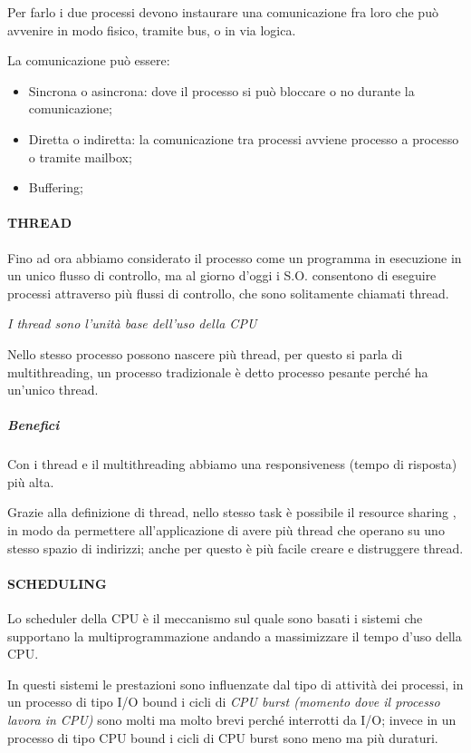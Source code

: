Per farlo i due processi devono instaurare una comunicazione fra loro
che può avvenire in modo fisico, tramite bus, o in via logica.

La comunicazione può essere:

\begin{itemize}
\item
  Sincrona o asincrona: dove il processo si può bloccare o no durante la
  comunicazione;
\item
  Diretta o indiretta: la comunicazione tra processi avviene processo a
  processo o tramite mailbox;
\item
  Buffering;
\end{itemize}

\paragraph{THREAD}\label{thread}

Fino ad ora abbiamo considerato il processo come un programma in
esecuzione in un unico flusso di controllo, ma al giorno d'oggi i S.O.
consentono di eseguire processi attraverso più flussi di controllo, che
sono solitamente chiamati thread.

\emph{I thread sono l'unità base dell'uso della CPU}

Nello stesso processo possono nascere più thread, per questo si parla di
multithreading, un processo tradizionale è detto processo pesante perché
ha un'unico thread.

\subparagraph{\texorpdfstring{\emph{Benefici}}{Benefici}}\label{benefici}

Con i thread e il multithreading abbiamo una responsiveness (tempo di
risposta) più alta.

Grazie alla definizione di thread, nello stesso task è possibile il
resource sharing , in modo da permettere all'applicazione di avere più
thread che operano su uno stesso spazio di indirizzi; anche per questo è
più facile creare e distruggere thread.

\paragraph{SCHEDULING}\label{scheduling}

Lo scheduler della CPU è il meccanismo sul quale sono basati i sistemi
che supportano la multiprogrammazione andando a massimizzare il tempo
d'uso della CPU.

In questi sistemi le prestazioni sono influenzate dal tipo di attività
dei processi, in un processo di tipo I/O bound i cicli di \emph{CPU
burst (momento dove il processo lavora in CPU)} sono molti ma molto
brevi perché interrotti da I/O; invece in un processo di tipo CPU bound
i cicli di CPU burst sono meno ma più duraturi.

